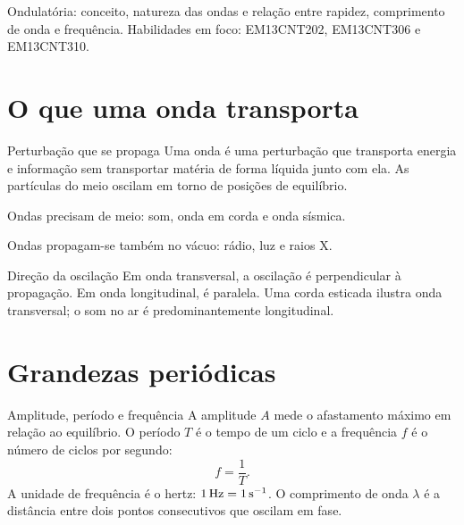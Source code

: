 \documentclass{notaaula}
\begin{document}
        \cabecalho

        \begin{sobre}
        Ondulatória: conceito, natureza das ondas e relação entre rapidez, comprimento de onda e frequência. Habilidades em foco: EM13CNT202, EM13CNT306 e EM13CNT310.
        \end{sobre}

        \section{O que uma onda transporta}

\begin{copiar}{Perturbação que se propaga}
Uma onda é uma perturbação que transporta energia e informação sem transportar matéria de forma
líquida junto com ela. As partículas do meio oscilam em torno de posições de equilíbrio.
\begin{itens}
\item Ondas  precisam de meio: som, onda em corda e onda sísmica.
\item Ondas  propagam-se também no vácuo: rádio, luz e raios X.
\end{itens}
\end{copiar}

\begin{copiar}{Direção da oscilação}
Em onda transversal, a oscilação é perpendicular à propagação. Em onda longitudinal, é paralela.
Uma corda esticada ilustra onda transversal; o som no ar é predominantemente longitudinal.
\end{copiar}

\section{Grandezas periódicas}

\begin{copiar}{Amplitude, período e frequência}
A amplitude $A$ mede o afastamento máximo em relação ao equilíbrio. O período $T$ é o tempo de um
ciclo e a frequência $f$ é o número de ciclos por segundo:
\[
  f=\frac{1}{T}.
\]
A unidade de frequência é o hertz: $1\,\mathrm{Hz}=1\,\mathrm{s^{-1}}$. O comprimento de onda $\lambda$ é a
distância entre dois pontos consecutivos que oscilam em fase.
\end{copiar}
\end{document}
